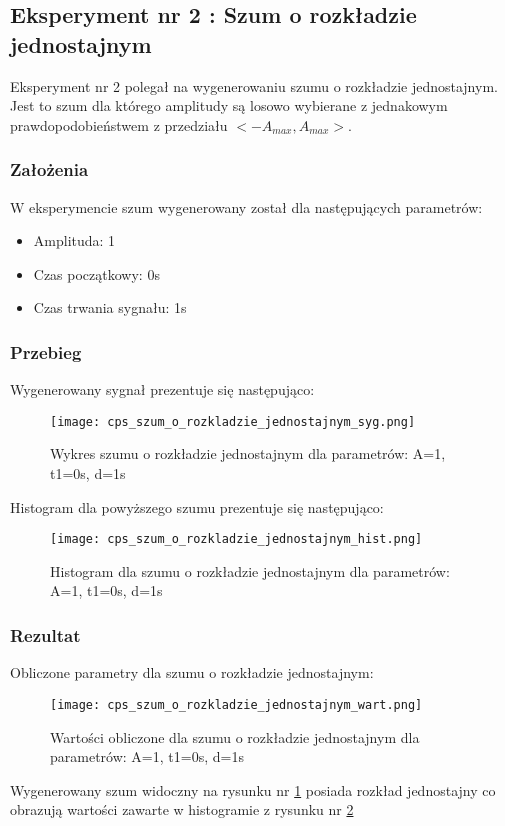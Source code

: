 \documentclass[12pt]{article}
\begin{document}
\newpage
\subsection{Eksperyment nr 2 : Szum o rozkładzie jednostajnym}

Eksperyment nr 2 polegał na wygenerowaniu szumu o rozkładzie jednostajnym. Jest to szum dla którego amplitudy są losowo wybierane z jednakowym prawdopodobieństwem z przedziału $<-A_{max},A_{max}>$.

\subsubsection{Założenia}

W eksperymencie szum wygenerowany został dla następujących parametrów:
\begin{itemize}
    \item Amplituda: 1
    \item Czas początkowy: 0s
    \item Czas trwania sygnału: 1s
\end{itemize}

\subsubsection{Przebieg}
Wygenerowany sygnał prezentuje się następująco:

\begin{figure}[H]
    \centering
    \texttt{[image: cps\_szum\_o\_rozkladzie\_jednostajnym\_syg.png]}
    \caption{Wykres szumu o rozkładzie jednostajnym dla parametrów:  A=1, t1=0s, d=1s}
    \label{wykres dla eksperymentu 2}
\end{figure}
\newpage
Histogram dla powyższego szumu prezentuje się następująco:

\begin{figure}[H]
    \centering
    \texttt{[image: cps\_szum\_o\_rozkladzie\_jednostajnym\_hist.png]}
    \caption{Histogram dla szumu o rozkładzie jednostajnym dla parametrów:  A=1, t1=0s, d=1s}
    \label{histogram dla eksperymentu 2}
\end{figure}


\subsubsection{Rezultat}
Obliczone parametry dla szumu o rozkładzie jednostajnym:
\begin{figure}[H]
    \centering
    \texttt{[image: cps\_szum\_o\_rozkladzie\_jednostajnym\_wart.png]}
    \caption{Wartości obliczone dla szumu o rozkładzie jednostajnym dla parametrów:  A=1, t1=0s, d=1s}
    \label{wartości dla eksperymentu 2}
\end{figure}
Wygenerowany szum widoczny na rysunku nr \ref{wykres dla eksperymentu 2} posiada rozkład jednostajny co obrazują wartości zawarte w histogramie z rysunku nr \ref{histogram dla eksperymentu 2}
\end{document}
